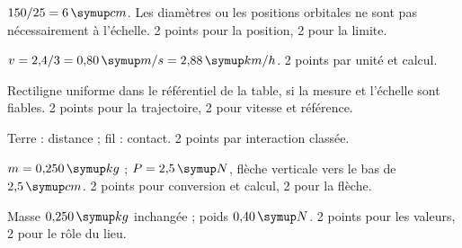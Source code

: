\par\noindent\begin{minipage}{\linewidth}
$150/25=6\unite{cm}$. Les diamètres ou les positions orbitales ne sont pas nécessairement à l’échelle. 2 points pour la position, 2 pour la limite.\par
{}
\end{minipage}\par
{}
\label{cor-B2}
\par\noindent\begin{minipage}{\linewidth}
$v=2{,}4/3=0{,}80\unite{m/s}=2{,}88\unite{km/h}$. 2 points par unité et calcul.\par
\end{minipage}\par
\par\noindent\begin{minipage}{\linewidth}
Rectiligne uniforme dans le référentiel de la table, si la mesure et l’échelle sont fiables. 2 points pour la trajectoire, 2 pour vitesse et référence.\par
\end{minipage}\par
\par\noindent\begin{minipage}{\linewidth}
Terre : distance ; fil : contact. 2 points par interaction classée.\par
{}
\end{minipage}\par
\par\noindent\begin{minipage}{\linewidth}
$m=0{,}250\unite{kg}$ ; $P=2{,}5\unite N$, flèche verticale vers le bas de $2{,}5\unite{cm}$. 2 points pour conversion et calcul, 2 pour la flèche.\par
{}
\end{minipage}\par
\par\noindent\begin{minipage}{\linewidth}
Masse $0{,}250\unite{kg}$ inchangée ; poids $0{,}40\unite N$. 2 points pour les valeurs, 2 pour le rôle du lieu.\par
\end{minipage}\par
